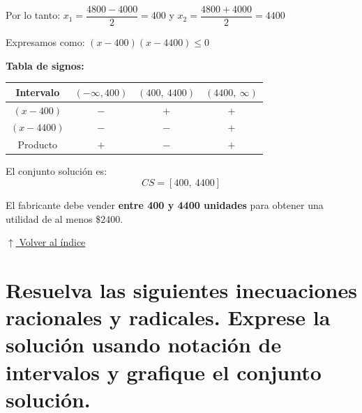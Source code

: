 \documentclass[12pt]{article}
\newcommand{\volverindice}{%
    \vspace{1em}%
    \begin{flushright}%
        \hyperlink{indice}{\small $\uparrow$ Volver al índice}%
    \end{flushright}%
}
\begin{document}
\begin{enumerate}[label=\alph*.-]
    Por lo tanto: $x_1 = \dfrac{4800 - 4000}{2} = 400$ \quad y \quad $x_2 = \dfrac{4800 + 4000}{2} = 4400$

    Expresamos como: $(x - 400)(x - 4400) \leq 0$

    \textbf{Tabla de signos:}

    \begin{center}
    \begin{tabular}{|c|c|c|c|}
    \hline
    Intervalo & $(-\infty, 400)$ & $(400,\ 4400)$ & $(4400,\ \infty)$ \\
    \hline
    $(x - 400)$ & $-$ & $+$ & $+$ \\
    \hline
    $(x - 4400)$ & $-$ & $-$ & $+$ \\
    \hline
    Producto & $+$ & $-$ & $+$ \\
    \hline
    \end{tabular}
    \end{center}

    El conjunto solución es:
    \[
    \boxed{CS = [400,\ 4400]}
    \]

    El fabricante debe vender \textbf{entre 400 y 4400 unidades} para obtener una utilidad de al menos \$2400.

\end{enumerate}

\volverindice
\newpage

\section[Inecuaciones racionales y radicales]{Resuelva las siguientes inecuaciones racionales y radicales. Exprese la solución usando notación de intervalos y grafique el conjunto solución.}
\end{document}
